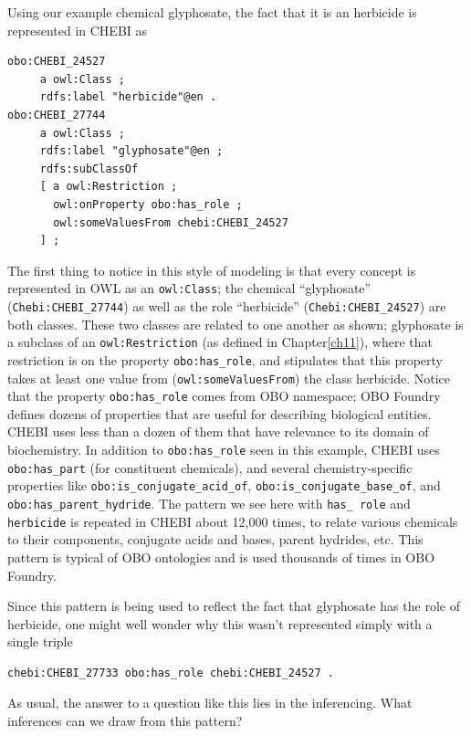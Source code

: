 Using our example chemical glyphosate, the fact that it is an herbicide
is represented in CHEBI as

\begin{lstlisting}
obo:CHEBI_24527
     a owl:Class ;
     rdfs:label "herbicide"@en .
obo:CHEBI_27744
     a owl:Class ;
     rdfs:label "glyphosate"@en ;
     rdfs:subClassOf
     [ a owl:Restriction ;
       owl:onProperty obo:has_role ;
       owl:someValuesFrom chebi:CHEBI_24527
     ] ;
\end{lstlisting}


The first thing to notice in this style of modeling is that every
concept is represented in OWL as an \texttt{owl:Class}; the chemical
``glyphosate'' (\texttt{Chebi:CHEBI\_27744}) as well as the role ``herbicide''
(\texttt{Chebi:CHEBI\_24527}) are both classes. These two classes are related to
one another as shown; glyphosate is a subclass of an \texttt{owl:Restriction} (as
defined in Chapter\ref{ch11}), where that restriction is on the property
\texttt{obo:has\_role}, and stipulates that this property takes at least one
value from (\texttt{owl:someValuesFrom}) the class herbicide. Notice that the
property \texttt{obo:has\_role} comes from OBO namespace; OBO Foundry defines
dozens of properties that are useful for describing biological
entities. CHEBI uses less than a dozen of them that have relevance to
its domain of biochemistry. In addition to \texttt{obo:has\_role} seen in this
example, CHEBI uses \texttt{obo:has\_part} (for constituent chemicals), and
several chemistry-specific properties like \texttt{obo:is\_conjugate\_acid\_of},
\texttt{obo:is\_conjugate\_base\_of}, and \texttt{obo:has\_parent\_hydride}. The pattern
we see here with \texttt{has\_ role} and \texttt{herbicide} is repeated in CHEBI
about 12,000 times, to relate various chemicals to their components,
conjugate acids and bases, parent hydrides, etc. This pattern is typical
of OBO ontologies and is used thousands of times in OBO Foundry.

Since this pattern is being used to reflect the fact that glyphosate has
the role of herbicide, one might well wonder why this wasn't represented
simply with a single triple

\begin{lstlisting}
chebi:CHEBI_27733 obo:has_role chebi:CHEBI_24527 .
\end{lstlisting}

As usual, the answer to a question like this lies in the inferencing.
What inferences can we draw from this pattern?

